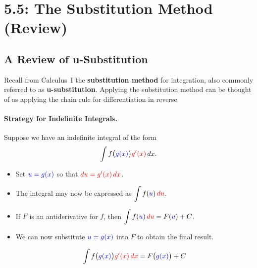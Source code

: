 \documentclass[12pt]{article}
\begin{document}
\section*{5.5: The Substitution Method (Review)}


\vspace{5mm}

\subsection*{A Review of u-Substitution}

Recall from Calculus~I the \textbf{substitution method} for integration, also commonly referred to as \textbf{u-substitution}. Applying the substitution method can be thought of as applying the chain rule for differentiation in reverse.

\paragraph{Strategy for Indefinite Integrals.} Suppose we have an indefinite integral of the form 
$$\displaystyle\int f\big(\textcolor{blue}{g(x)}\big) \textcolor{red}{g'(x)}\,dx.$$
\begin{itemize}
\item[\tc{1}] Set $\textcolor{blue}{u=g(x)}$ so that $\textcolor{red}{du=g'(x)\,dx}$.
\item[\tc{2}] The integral may now be expressed as $\displaystyle\int f(\textcolor{blue}{u})\,\textcolor{red}{du}$.
\item[\tc{3}] If $F$ is an antiderivative for $f$, then $\displaystyle\int f(\textcolor{blue}{u})\,\textcolor{red}{du}=F(\textcolor{blue}{u})+C$.
\item[\tc{4}] We can now substitute $\textcolor{blue}{u=g(x)}$ into $F$ to obtain the final result.

$$\int f\big( \textcolor{blue}{g(x)}\big) \textcolor{red}{g'(x)\,dx}=F\big(\textcolor{blue}{g(x)}\big) + C$$
\end{itemize}
\end{document}
